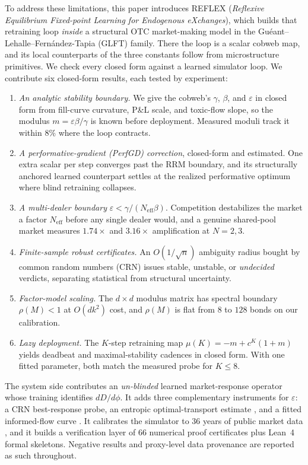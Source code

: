\documentclass[sigconf,anonymous,review]{acmart}
\newcommand{\eps}{\varepsilon}
\newcommand{\Neff}{N_{\mathrm{eff}}}
\begin{document}
To address these limitations, this paper introduces REFLEX
(\emph{Reflexive Equilibrium Fixed-point Learning for Endogenous
eXchanges}), which builds that retraining loop \emph{inside} a
structural OTC market-making model in the
Gu\'eant--Lehalle--Fern\'andez-Tapia (GLFT) family. There the loop is a
scalar cobweb map, and its local counterparts of the three constants follow
from microstructure primitives. We check every closed form against a learned
simulator loop. We contribute six closed-form results, each tested by
experiment:
\begin{enumerate}
\item[\textbf{R1}] \emph{An analytic stability boundary.} We give the
  cobweb's $\gamma$, $\beta$, and $\eps$ in closed form from fill-curve
  curvature, P\&L scale, and toxic-flow slope, so the modulus
  $m=\eps\beta/\gamma$ is known before deployment. Measured moduli track it
  within $8\%$ where the loop contracts.
\item[\textbf{R2}] \emph{A performative-gradient (PerfGD) correction},
  closed-form and estimated. One extra scalar per step converges past the
  RRM boundary, and its structurally anchored learned counterpart settles at
  the realized performative optimum where blind retraining collapses.
\item[\textbf{R3}] \emph{A multi-dealer boundary} $\eps<\gamma/(\Neff\beta)$.
  Competition destabilizes the market a factor $\Neff$ before any single
  dealer would, and a genuine shared-pool market measures $1.74\times$ and
  $3.16\times$ amplification at $N=2,3$.
\item[\textbf{R4}] \emph{Finite-sample robust certificates.} An
  $O(1/\sqrt{n})$ ambiguity radius bought by common random numbers (CRN)
  issues stable, unstable, or \emph{undecided} verdicts, separating
  statistical from structural uncertainty.
\item[\textbf{R5}] \emph{Factor-model scaling.} The $d{\times}d$ modulus
  matrix has spectral boundary $\rho(M)<1$ at $O(dk^2)$ cost, and
  $\rho(M)$ is flat from $8$ to $128$ bonds on our calibration.
\item[\textbf{R6}] \emph{Lazy deployment.} The $K$-step retraining map
  $\mu(K)=-m+c^K(1+m)$ yields deadbeat and maximal-stability cadences in
  closed form. With one fitted parameter, both match the measured probe for
  $K\le8$.
\end{enumerate}

The system side contributes an \emph{un-blinded} learned market-response
operator whose training identifies $dD/d\phi$. It adds three complementary
instruments for $\eps$: a CRN best-response probe, an entropic
optimal-transport estimate \cite{cuturi2013sinkhorn,feydy2019interpolating,
peyre2019computational}, and a fitted informed-flow curve
\cite{cont2014price}. It calibrates the simulator to 36 years of public
market data \cite{dickerson2023priced,friewald2012illiquidity}, and it builds
a verification layer of 66 numerical proof certificates plus Lean~4
\cite{moura2021lean,mathlib2020} formal skeletons. Negative results and
proxy-level data provenance are reported as such throughout.
\end{document}
